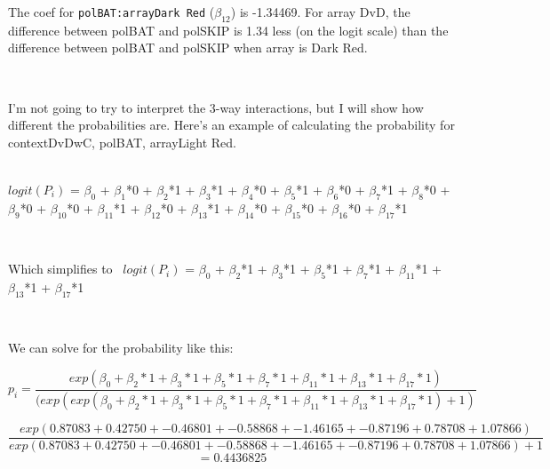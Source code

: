 \documentclass{article}
\begin{document}
The coef for \texttt{polBAT:arrayDark Red} ($\beta_{12}$) is -1.34469. For array DvD, the difference between polBAT and polSKIP is 1.34 less (on the logit scale) than the difference between polBAT and polSKIP when array is Dark Red. 


\ 

I'm not going to try to interpret the 3-way interactions, but I will show how different the probabilities are. Here's an example of calculating the probability for contextDvDwC, polBAT, arrayLight Red.

\noindent
\\
$logit(P_i)$ =  
$\beta_0$ + 
$\beta_1$*0 +  
$\beta_2$*1 +  
$\beta_3$*1 + 
$\beta_4$*0 + 
$\beta_5$*1 +  
$\beta_6$*0 + 
$\beta_7$*1 +  
$\beta_8$*0 + 
$\beta_9$*0 + 
$\beta_{10}$*0 +
$\beta_{11}$*1 +  
$\beta_{12}$*0 +   
$\beta_{13}$*1 + 
$\beta_{14}$*0 +
$\beta_{15}$*0 + 
$\beta_{16}$*0 +
$\beta_{17}$*1

\ 

Which simplifies to \  
$logit(P_i)$ =  
$\beta_0$ + 
$\beta_2$*1 +  
$\beta_3$*1 + 
$\beta_5$*1 +  
$\beta_7$*1 +  
$\beta_{11}$*1 +  
$\beta_{13}$*1 + 
$\beta_{17}$*1

\ 


We can solve for the probability like this: 

$$p_i = \frac{exp(\beta_0 + 
\beta_2*1 +  
\beta_3*1 + \beta_5*1 + 
\beta_7*1 + \beta_{11}*1 + \beta_{13}* 1 + \beta_{17}*1)}{(exp(exp(\beta_0 + 
\beta_2*1 +  
\beta_3*1 + \beta_5*1 + 
\beta_7*1 + \beta_{11}*1 + \beta_{13}* 1 + \beta_{17}*1) + 1)}$$

$$\frac{exp(0.87083 + 0.42750 + -0.46801 + -0.58868 + -1.46165 + -0.87196 + 0.78708 + 1.07866)  }
{exp(0.87083 + 0.42750 + -0.46801 + -0.58868 + -1.46165 + -0.87196 + 0.78708 + 1.07866) + 1}$$ 
$$= 0.4436825$$

\ 
\end{document}
